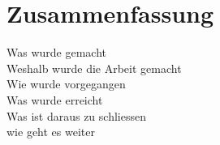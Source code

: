 \section{Zusammenfassung}
Was wurde gemacht\\
Weshalb wurde die Arbeit gemacht\\
Wie wurde vorgegangen\\
Was wurde erreicht\\
Was ist daraus zu schliessen\\
wie geht es weiter\\
